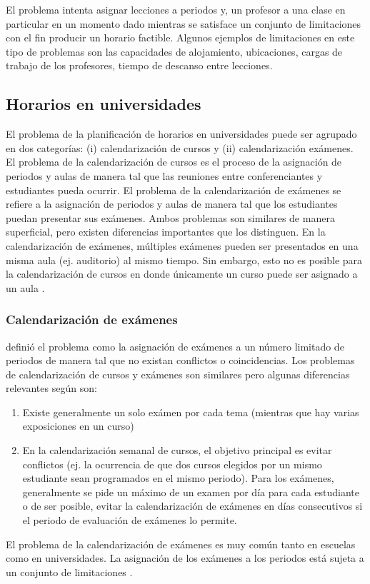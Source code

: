 \documentclass[draft,12pt,headsepline,footsepline,paper=letter]{scrreprt}
\begin{document}
El problema intenta asignar lecciones a periodos y, un profesor a una clase en particular en un momento dado mientras se satisface un conjunto de limitaciones con el fin producir un horario factible. Algunos ejemplos de limitaciones en este tipo de problemas son las capacidades de alojamiento, ubicaciones, cargas de trabajo de los profesores, tiempo de descanso entre lecciones.

\subsection{Horarios en universidades}

El problema de la planificación de horarios en universidades puede ser agrupado en dos categorías: (i) calendarización de cursos y (ii) calendarización exámenes.
El problema de la calendarización de cursos es el proceso de la asignación de periodos y aulas de manera tal que las reuniones entre conferenciantes y estudiantes pueda ocurrir.
El problema de la calendarización de exámenes se refiere a la asignación de periodos y aulas de manera tal que los estudiantes puedan presentar sus exámenes.
Ambos problemas son similares de manera superficial, pero existen diferencias importantes que los distinguen.
En la calendarización de exámenes, múltiples exámenes pueden ser presentados en una misma aula (ej. auditorio) al mismo tiempo.
Sin embargo, esto no es posible para la calendarización de cursos en donde únicamente un curso puede ser asignado a un aula \citep[p.~11]{abdullah06heuristic-approaches}.

\subsubsection{Calendarización de exámenes}

\citet[p.~4]{carter95recent-developments} definió el problema como la asignación de exámenes a un número limitado de periodos de manera tal que no existan conflictos o coincidencias. Los problemas de calendarización de cursos y exámenes son similares pero algunas diferencias relevantes según \citet[p.~159]{werra85an-introduction-to-timetabling} son:
\begin{enumerate}[a]
\item Existe generalmente un solo exámen por cada tema (mientras que hay varias exposiciones en un curso)
\item En la calendarización semanal de cursos, el objetivo principal es evitar conflictos (ej. la ocurrencia de que dos cursos elegidos por un mismo estudiante sean programados en el mismo periodo). Para los exámenes, generalmente se pide un máximo de un examen por día para cada estudiante o de ser posible, evitar la calendarización de exámenes en días consecutivos si el periodo de evaluación de exámenes lo permite.
\end{enumerate}
El problema de la calendarización de exámenes es muy común tanto en escuelas como en universidades. La asignación de los exámenes a los periodos está sujeta a un conjunto de limitaciones \citep[p.~12]{abdullah06heuristic-approaches}.
\end{document}
